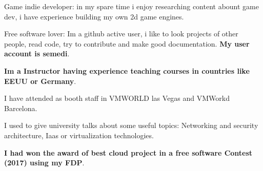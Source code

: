 

\vspace{5mm}

      \begin{cvitems} %
        \item{Game indie developer: in my spare time i enjoy researching content abount game dev, i have experience building my own 2d game engines.}
        \item{Free software lover: Im a github active user, i like to look projects of other people, read code, try to contribute and make good documentation. \textbf{My user account is semedi}.}
        \item{\textbf{Im a Instructor having experience teaching courses in countries like EEUU or Germany}.}
        \item{I have attended as booth staff in VMWORLD las Vegas and VMWorkd Barcelona.}
        \item{I used to give university talks about some useful topics: Networking and security architecture, Iaas or virtualization technologies.}
        \item{\textbf{I had won the award of best cloud project in a free software Contest (2017) using  my FDP}.}
      \end{cvitems}
